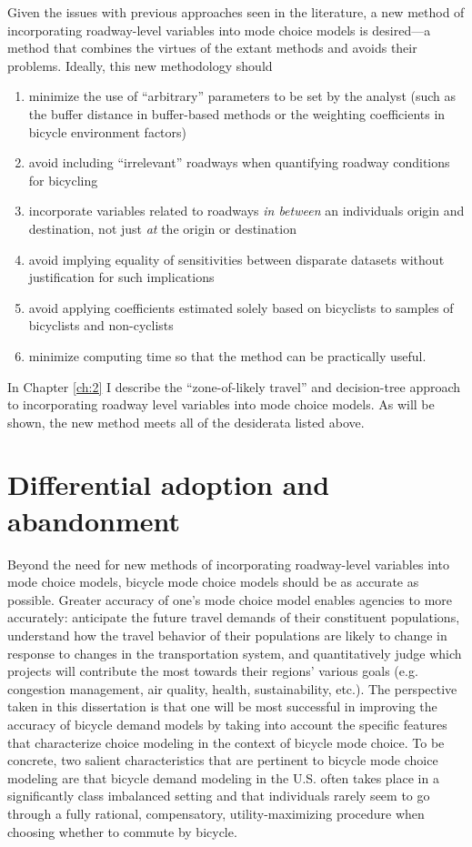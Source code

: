 Given the issues with previous approaches seen in the literature, a new method of incorporating roadway-level variables into mode choice models is desired---a method that combines the virtues of the extant methods and avoids their problems. Ideally, this new methodology should
\begin{enumerate}
\item minimize the use of ``arbitrary'' parameters to be set by the analyst (such as the buffer distance in buffer-based methods or the weighting coefficients in bicycle environment factors)
\item avoid including ``irrelevant'' roadways when quantifying roadway conditions for bicycling
\item incorporate variables related to roadways \textit{in between} an individuals origin and destination, not just \textit{at} the origin or destination
\item avoid implying equality of sensitivities between disparate datasets without justification for such implications
\item avoid applying coefficients estimated solely based on bicyclists to samples of bicyclists and non-cyclists
\item minimize computing time so that the method can be practically useful.
\end{enumerate}

In Chapter  \ref{ch:2} I describe the ``zone-of-likely travel'' and decision-tree approach to incorporating roadway level variables into mode choice models. As will be shown, the new method meets all of the desiderata listed above.

\section{Differential adoption and abandonment}
\label{sec:asym-motivation}
Beyond the need for new methods of incorporating roadway-level variables into mode choice models, bicycle mode choice models should be as accurate as possible. Greater accuracy of one's mode choice model enables agencies to more accurately: anticipate the future travel demands of their constituent populations, understand how the travel behavior of their populations are likely to change in response to changes in the transportation system, and quantitatively judge which projects will contribute the most towards their regions' various goals (e.g. congestion management, air quality, health, sustainability, etc.). The perspective taken in this dissertation is that one will be most successful in improving the accuracy of bicycle demand models by taking into account the specific features that characterize choice modeling in the context of bicycle mode choice. To be concrete, two salient characteristics that are pertinent to bicycle mode choice modeling are that bicycle demand modeling in the U.S. often takes place in a significantly class imbalanced setting and that individuals rarely seem to go through a fully rational, compensatory, utility-maximizing procedure when choosing whether to commute by bicycle. 

